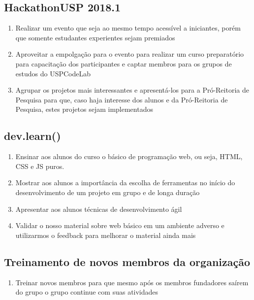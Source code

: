 \documentclass[a0,portrait]{a0poster}
\begin{document}
\begin{multicols}{2}
\subsection*{HackathonUSP 2018.1}
\begin{enumerate}
    \item Realizar um evento que seja ao mesmo tempo acessível a iniciantes, porém que somente estudantes
    experientes sejam premiados
    
    \item Aproveitar a empolgação para o evento para realizar um curso preparatório para
    capacitação dos participantes e captar membros para os grupos de estudos do USPCodeLab
    
    \item Agrupar os projetos mais interessantes e apresentá-los para a Pró-Reitoria de Pesquisa
    para que, caso haja interesse dos alunos e da Pró-Reitoria de Pesquisa, estes projetos sejam
    implementados
\end{enumerate}

\subsection*{dev.learn()}
\begin{enumerate}
    \item Ensinar aos alunos do curso o básico de programação web, ou seja, HTML, CSS e JS
    puros.
   
    \item Mostrar aos alunos a importância da escolha de ferramentas no início do desenvolvimento
    de um projeto em grupo e de longa duração
    
    \item Apresentar aos alunos técnicas de desenvolvimento ágil
    
    \item Validar o nosso material sobre web básico em um ambiente adverso e utilizarmos o feedback
    para melhorar o material ainda mais
\end{enumerate}

\subsection*{Treinamento de novos membros da organização}
\begin{enumerate}
    \item Treinar novos membros para que mesmo após os membros fundadores saírem do grupo
    o grupo continue com suas atividades
    

\end{enumerate}
\end{multicols}
\end{document}
